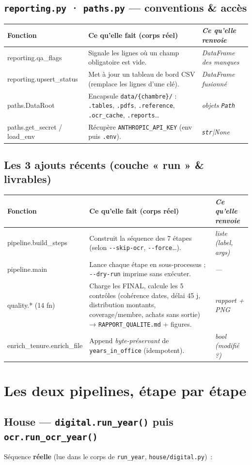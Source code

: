 \documentclass[11pt,a4paper]{article}
\newcommand{\co}[1]{\texttt{\small #1}}
\newenvironment{fntab}{%
  \par\small
  \begin{longtable}{>{\ttfamily\footnotesize}p{3.0cm} p{9.1cm} >{\itshape\footnotesize}p{3.4cm}}
  \toprule
  \normalfont\bfseries Fonction & \bfseries Ce qu'elle fait (corps réel) & \normalfont\bfseries Ce qu'elle renvoie\\
  \midrule\endhead
}{\bottomrule\end{longtable}\par}
\begin{document}
\subsection{\texttt{reporting.py} · \texttt{paths.py} — conventions \& accès}
\begin{fntab}
reporting.qa_flags & Signale les lignes où un champ obligatoire est vide. & DataFrame des manques \\
reporting.upsert_status & Met à jour un tableau de bord CSV (remplace les lignes d'une clé). & DataFrame fusionné \\
paths.DataRoot & Encapsule \co{data/\{chambre\}/} : \co{.tables}, \co{.pdfs}, \co{.reference}, \co{.ocr_cache}, \co{.reports}… & objets \co{Path} \\
paths.get_secret / load_env & Récupère \co{ANTHROPIC_API_KEY} (env puis \co{.env}). & \co{str}|None \\
\end{fntab}

\subsection{Les 3 ajouts récents (couche « run » \& livrables)}
\begin{fntab}
pipeline.build_steps & Construit la séquence des 7 étapes (selon \co{-{}-skip-ocr}, \co{-{}-force}…). & liste (label, args) \\
pipeline.main & Lance chaque étape en sous-processus ; \co{-{}-dry-run} imprime sans exécuter. & — \\
quality.* (14 fn) & Charge les FINAL, calcule les 5 contrôles (cohérence dates, délai 45 j, distribution montants, coverage/membre, achats sans sortie) → \co{RAPPORT_QUALITE.md} + figures. & rapport + PNG \\
enrich_tenure.enrich_file & Append \emph{byte-préservant} de \co{years_in_office} (idempotent). & bool (modifié ?) \\
\end{fntab}

\section{Les deux pipelines, étape par étape}

\subsection{House — \texttt{digital.run\_year()} puis \texttt{ocr.run\_ocr\_year()}}
Séquence \textbf{réelle} (lue dans le corps de \co{run_year}, \co{house/digital.py})~:
\end{document}
